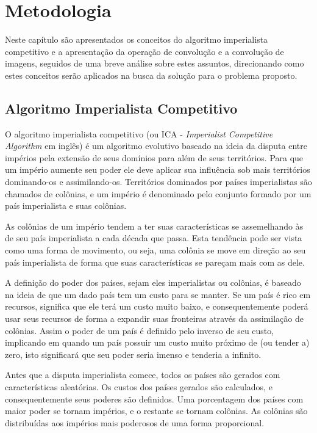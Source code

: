 \chapter{Metodologia}
\label{Metodologia}
%


Neste capítulo são apresentados os conceitos do algoritmo imperialista competitivo e a apresentação da operação de convolução e a convolução de imagens, seguidos de uma breve análise sobre estes assuntos, direcionando como estes conceitos serão aplicados na busca da solução para o problema proposto.

\section{Algoritmo Imperialista Competitivo}

O algoritmo imperialista competitivo \cite{atashpaz2007imperialist} (ou ICA - \emph{Imperialist Competitive Algorithm} em inglês) é um algoritmo evolutivo baseado na ideia da disputa entre impérios pela extensão de seus domínios para além de seus territórios. Para que um império aumente seu poder ele deve aplicar sua influência sob mais territórios dominando-os e assimilando-os. Territórios dominados por países imperialistas são chamados de colônias, e um império é denominado pelo conjunto formado por um país imperialista e suas colônias.

As colônias de um império tendem a ter suas características se assemelhando às de seu país imperialista a cada década que passa. Esta tendência pode ser vista como uma forma de movimento, ou seja, uma colônia se move em direção ao seu país imperialista de forma que suas características se pareçam mais com as dele.

A definição do poder dos países, sejam eles imperialistas ou colônias, é baseado na ideia de que um dado país tem um custo para se manter. Se um país é rico em recursos, significa que ele terá um custo muito baixo, e consequentemente poderá usar seus recursos de forma a expandir suas fronteiras através da assimilação de colônias. Assim o poder de um país é definido pelo inverso de seu custo, implicando em quando um país possuir um custo muito próximo de (ou tender a) zero, isto significará que seu poder seria imenso e tenderia a infinito.

Antes que a disputa imperialista comece, todos os países são gerados com características aleatórias. Os custos dos países gerados são calculados, e consequentemente seus poderes são definidos. Uma porcentagem dos países com maior poder se tornam impérios, e o restante se tornam colônias. As colônias são distribuídas aos impérios mais poderosos de uma forma proporcional.

